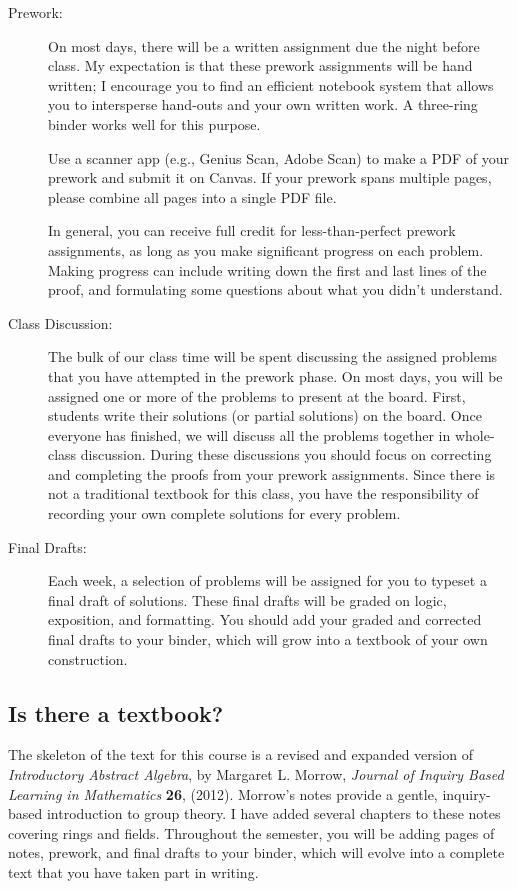 \documentclass[
  twoside]{article}
\begin{document}
\begin{description}
          \item[Prework:] On most days, there will be a written assignment due the night before class. My expectation is that these prework assignments will be hand written; I encourage you to find an efficient notebook system that allows you to intersperse hand-outs and your own written work. A three-ring binder works well for this purpose.
          
Use a scanner app (e.g., Genius Scan, Adobe Scan) to make a PDF of your prework and submit it on Canvas. If your prework spans multiple pages, please combine all pages into a single PDF file.
          
In general, you can receive full credit for less-than-perfect prework assignments, as long as you make significant progress on each problem.  Making progress can include writing down the first and last lines of the proof, and formulating some questions about what you didn't understand.
          \item[Class Discussion:] The bulk of our class time will be spent discussing the assigned problems that you have attempted in the prework phase. On most days, you will be assigned one or more of the problems to present at the board. First,  students write their solutions (or partial solutions) on the board. Once everyone has finished, we will discuss all the problems together in whole-class discussion. During these discussions you should focus on correcting and completing the proofs from your prework assignments. Since there is not a traditional textbook for this class, you have the responsibility of recording your own complete solutions for every problem.
          \item[Final Drafts:]  Each week, a selection of problems will be assigned for you to typeset a final draft of solutions. These final drafts will be graded on logic, exposition, and formatting. You should add your graded and corrected final drafts to your binder, which will grow into a textbook of your own construction.
      \end{description}

\hypertarget{is-there-a-textbook}{%
\subsection{Is there a textbook?}\label{is-there-a-textbook}}

The skeleton of the text for this course is a revised and expanded
version of \textit{Introductory Abstract Algebra}, by Margaret L.
Morrow, \textit{Journal of Inquiry Based Learning in Mathematics}
\textbf{26}, (2012). Morrow's notes provide a gentle, inquiry-based
introduction to group theory. I have added several chapters to these
notes covering rings and fields. Throughout the semester, you will be
adding pages of notes, prework, and final drafts to your binder, which
will evolve into a complete text that you have taken part in writing.
\end{document}
